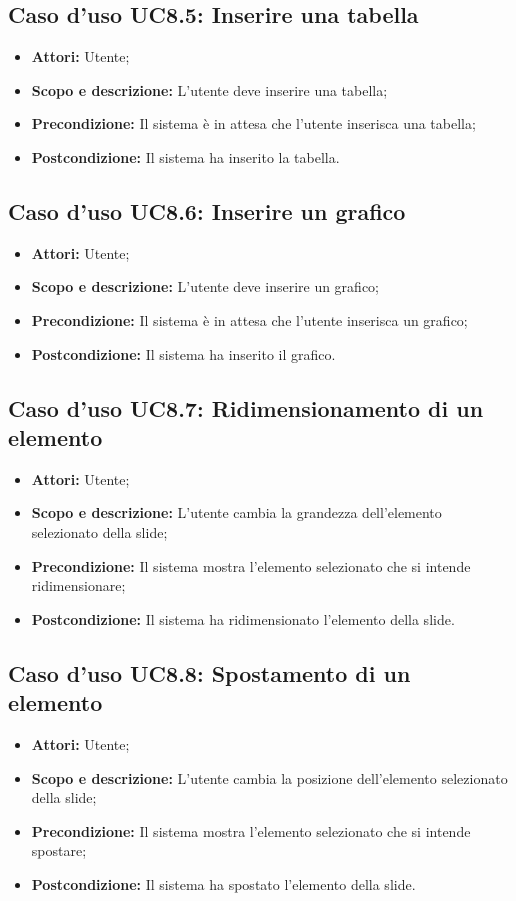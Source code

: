 \subsection{Caso d'uso UC8.5: Inserire una tabella}
\begin{itemize}
	\item \textbf{Attori:} Utente;
	\item \textbf{Scopo e descrizione:} L'utente deve inserire una tabella;
	\item \textbf{Precondizione:} Il sistema è in attesa che l'utente inserisca una tabella;
	\item \textbf{Postcondizione:} Il sistema ha inserito la tabella.
\end{itemize}

\subsection{Caso d'uso UC8.6: Inserire un grafico}
\begin{itemize}
	\item \textbf{Attori:} Utente;
	\item \textbf{Scopo e descrizione:} L'utente deve inserire un grafico;
	\item \textbf{Precondizione:} Il sistema è in attesa che l'utente inserisca un grafico;
	\item \textbf{Postcondizione:} Il sistema ha inserito il grafico.
\end{itemize}

\subsection{Caso d'uso UC8.7: Ridimensionamento di un elemento}
\begin{itemize}
	\item \textbf{Attori:} Utente;
	\item \textbf{Scopo e descrizione:} L'utente cambia la grandezza dell'elemento selezionato della slide;
	\item \textbf{Precondizione:} Il sistema mostra l'elemento selezionato che si intende ridimensionare;
	\item \textbf{Postcondizione:} Il sistema ha ridimensionato l'elemento della slide.
\end{itemize}

\subsection{Caso d'uso UC8.8: Spostamento di un elemento}
\begin{itemize}
	\item \textbf{Attori:} Utente;
	\item \textbf{Scopo e descrizione:} L'utente cambia la posizione dell'elemento selezionato della slide;
	\item \textbf{Precondizione:} Il sistema mostra l'elemento selezionato che si intende spostare;
	\item \textbf{Postcondizione:} Il sistema ha spostato l'elemento della slide.
\end{itemize}

